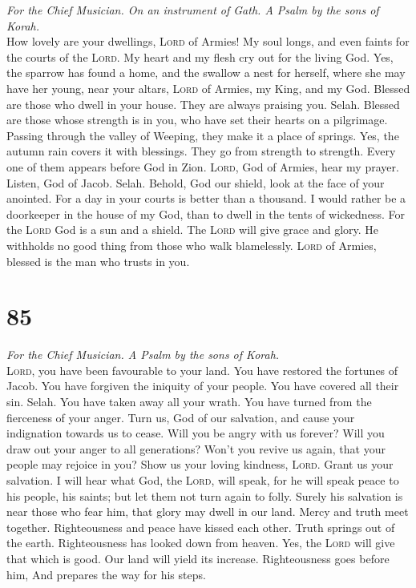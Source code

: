 \emph{For the Chief Musician. On an instrument of Gath. A Psalm by the
sons of Korah.}\\
 How lovely are your dwellings, \textsc{Lord} of Armies!
 My soul longs, and even faints for the courts of the
\textsc{Lord}. My heart and my flesh cry out for the living God.
 Yes, the sparrow has found a home, and the swallow a nest
for herself, where she may have her young, near your altars,
\textsc{Lord} of Armies, my King, and my God.  Blessed are
those who dwell in your house. They are always praising you. Selah.
 Blessed are those whose strength is in you, who have set
their hearts on a pilgrimage.  Passing through the valley
of Weeping, they make it a place of springs. Yes, the autumn rain covers
it with blessings.  They go from strength to strength.
Every one of them appears before God in Zion. 
\textsc{Lord}, God of Armies, hear my prayer. Listen, God of Jacob.
Selah.  Behold, God our shield, look at the face of your
anointed.  For a day in your courts is better than a
thousand. I would rather be a doorkeeper in the house of my God, than to
dwell in the tents of wickedness.  For the \textsc{Lord}
God is a sun and a shield. The \textsc{Lord} will give grace and glory.
He withholds no good thing from those who walk blamelessly.
 \textsc{Lord} of Armies, blessed is the man who trusts
in you.

\hypertarget{section-84}{%
\section{85}\label{section-84}}

\emph{For the Chief Musician. A Psalm by the sons of Korah.}\\
 \textsc{Lord}, you have been favourable to your land. You
have restored the fortunes of Jacob.  You have forgiven
the iniquity of your people. You have covered all their sin. Selah.
 You have taken away all your wrath. You have turned from
the fierceness of your anger.  Turn us, God of our
salvation, and cause your indignation towards us to cease.
 Will you be angry with us forever? Will you draw out your
anger to all generations?  Won't you revive us again, that
your people may rejoice in you?  Show us your loving
kindness, \textsc{Lord}. Grant us your salvation.  I will
hear what God, the \textsc{Lord}, will speak, for he will speak peace to
his people, his saints; but let them not turn again to folly.
 Surely his salvation is near those who fear him, that
glory may dwell in our land.  Mercy and truth meet
together. Righteousness and peace have kissed each other.
 Truth springs out of the earth. Righteousness has looked
down from heaven.  Yes, the \textsc{Lord} will give that
which is good. Our land will yield its increase. 
Righteousness goes before him, And prepares the way for his steps.

